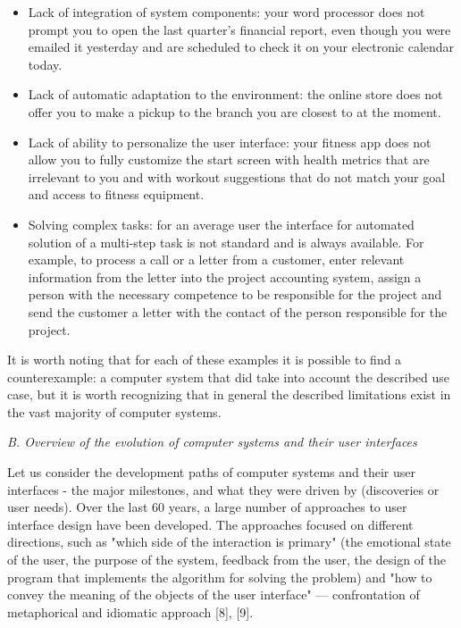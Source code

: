 \documentclass[10pt]{article}
\begin{document}
\begin{itemize}
    \item Lack of integration of system components: your
word processor does not prompt you to open the
last quarter’s financial report, even though you were
emailed it yesterday and are scheduled to check it
on your electronic calendar today.

\item Lack of automatic adaptation to the environment:
the online store does not offer you to make a pickup
to the branch you are closest to at the moment.

\item Lack of ability to personalize the user interface:
your fitness app does not allow you to fully customize
the start screen with health metrics that
are irrelevant to you and with workout suggestions
that do not match your goal and access to fitness
equipment.

\item Solving complex tasks: for an average user the
interface for automated solution of a multi-step task
is not standard and is always available. For example,
to process a call or a letter from a customer, enter
relevant information from the letter into the project
accounting system, assign a person with the necessary
competence to be responsible for the project
and send the customer a letter with the contact of
the person responsible for the project.

\end{itemize}

It is worth noting that for each of these examples it is
possible to find a counterexample: a computer system
that did take into account the described use case, but
it is worth recognizing that in general the described
limitations exist in the vast majority of computer systems.

\vspace{+4mm}\textit{B. Overview of the evolution of computer systems and
their user interfaces}

\vspace{+4mm}Let us consider the development paths of computer
systems and their user interfaces - the major milestones,
and what they were driven by (discoveries or user needs).
Over the last 60 years, a large number of approaches
to user interface design have been developed. The approaches
focused on different directions, such as "which
side of the interaction is primary" (the emotional state
of the user, the purpose of the system, feedback from
the user, the design of the program that implements the
algorithm for solving the problem) and "how to convey
the meaning of the objects of the user interface" —
confrontation of metaphorical and idiomatic approach
[8], [9].
\end{document}
